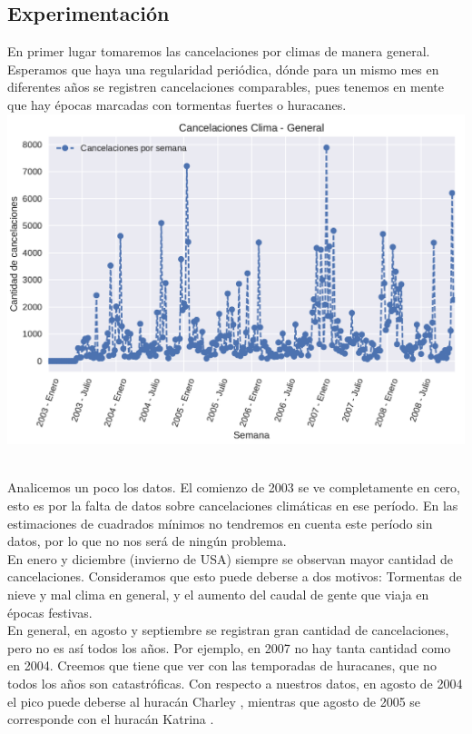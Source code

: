 \subsection{Experimentación}

En primer lugar tomaremos las cancelaciones por climas de manera general. Esperamos que haya una regularidad periódica, dónde para un mismo mes en diferentes años se registren cancelaciones comparables, pues tenemos en mente que hay épocas marcadas con tormentas fuertes o huracanes. \\

{\centering
    \includegraphics[scale=0.8]{informe/imagenes/cancelacionesClimaGeneralPlotV1.pdf} \\
}
$ $\newline

Analicemos un poco los datos. El comienzo de 2003 se ve completamente en cero, esto es por la falta de datos sobre cancelaciones climáticas en ese período. En las estimaciones de cuadrados mínimos no tendremos en cuenta este período sin datos, por lo que no nos será de ningún problema. \\

En enero y diciembre (invierno de USA) siempre se observan mayor cantidad de cancelaciones. Consideramos que esto puede deberse a dos motivos: Tormentas de nieve y mal clima en general, y el aumento del caudal de gente que viaja en épocas festivas. \\

En general, en agosto y septiembre se registran gran cantidad de cancelaciones, pero no es así todos los años. Por ejemplo, en 2007 no hay tanta cantidad como en 2004. Creemos que tiene que ver con las temporadas de huracanes, que no todos los años son catastróficas. Con respecto a nuestros datos, en agosto de 2004 el pico puede deberse al huracán Charley \cite{HuracanCharley}, mientras que agosto de 2005 se corresponde con el huracán Katrina \cite{HuracanKatrina}. \\

